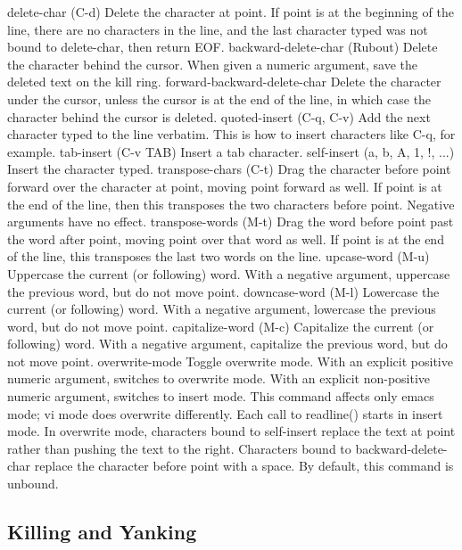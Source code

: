 delete-char (C-d)
Delete the character at point. If point is at the beginning of the line, there are no characters in the line, and the last character typed was not bound to delete-char, then return EOF.
backward-delete-char (Rubout)
Delete the character behind the cursor. When given a numeric argument, save the deleted text on the kill ring.
forward-backward-delete-char
Delete the character under the cursor, unless the cursor is at the end of the line, in which case the character behind the cursor is deleted.
quoted-insert (C-q, C-v)
Add the next character typed to the line verbatim. This is how to insert characters like C-q, for example.
tab-insert (C-v TAB)
Insert a tab character.
self-insert (a, b, A, 1, !, ...)
Insert the character typed.
transpose-chars (C-t)
Drag the character before point forward over the character at point, moving point forward as well. If point is at the end of the line, then this transposes the two characters before point. Negative arguments have no effect.
transpose-words (M-t)
Drag the word before point past the word after point, moving point over that word as well. If point is at the end of the line, this transposes the last two words on the line.
upcase-word (M-u)
Uppercase the current (or following) word. With a negative argument, uppercase the previous word, but do not move point.
downcase-word (M-l)
Lowercase the current (or following) word. With a negative argument, lowercase the previous word, but do not move point.
capitalize-word (M-c)
Capitalize the current (or following) word. With a negative argument, capitalize the previous word, but do not move point.
overwrite-mode
Toggle overwrite mode. With an explicit positive numeric argument, switches to overwrite mode. With an explicit non-positive numeric argument, switches to insert mode. This command affects only emacs mode; vi mode does overwrite differently. Each call to readline() starts in insert mode. In overwrite mode, characters bound to self-insert replace the text at point rather than pushing the text to the right. Characters bound to backward-delete-char replace the character before point with a space. By default, this command is unbound.
\subsection{Killing and Yanking}\label{sec:killingandyanking}

